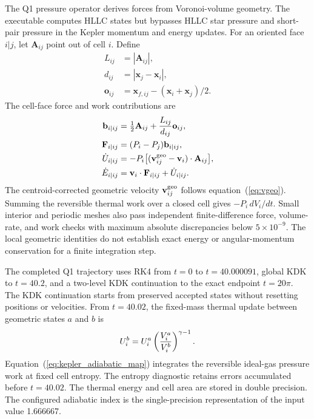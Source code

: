 \documentclass[twocolumn]{aastex63}
\begin{document}
The Q1 pressure operator derives forces from Voronoi-volume geometry.
The executable computes HLLC states but bypasses HLLC star pressure and
short-pair pressure in the Kepler momentum and energy updates. For an
oriented face $i|j$, let $\mathbf A_{ij}$ point out of cell $i$. Define
\begin{equation*}
\begin{aligned}
  L_{ij}&=|\mathbf A_{ij}|,\\
  d_{ij}&=|\mathbf x_j-\mathbf x_i|,\\
  \mathbf o_{ij}&=\mathbf x_{f,ij}-(\mathbf x_i+\mathbf x_j)/2.
\end{aligned}
\end{equation*}
The cell-face force and work contributions are
\begin{align}
  \mathbf b_{i|ij}&=\tfrac12\mathbf A_{ij}
                   +{L_{ij}\over d_{ij}}\mathbf o_{ij},\\
  \mathbf F_{i|ij}&=(P_i-P_j)\mathbf b_{i|ij},\\
  \dot U_{i|ij}&=-P_i\bigl[(\mathbf v_{ij}^{\rm geo}-\mathbf v_i)
                           \cdot\mathbf A_{ij}\bigr],\\
  \dot E_{i|ij}&=\mathbf v_i\cdot\mathbf F_{i|ij}+\dot U_{i|ij}.
  \label{eq:varpress_w0}
\end{align}
The centroid-corrected geometric velocity $\mathbf v_{ij}^{\rm geo}$ follows
equation~(\ref{eq:vgeo}). Summing the reversible thermal work over a closed
cell gives $-P_i\,dV_i/dt$. Small interior and periodic meshes also pass
independent finite-difference force, volume-rate, and work checks with
maximum absolute discrepancies below $5\times10^{-9}$. The local geometric
identities do not establish exact energy or angular-momentum conservation
for a finite integration step.

The completed Q1 trajectory uses RK4 from $t=0$ to $t=40.000091$,
global KDK to $t=40.2$, and a two-level KDK continuation to the exact
endpoint $t=20\pi$. The KDK continuation starts from preserved accepted
states without resetting positions or velocities. From $t=40.02$, the
fixed-mass thermal update between geometric states $a$ and $b$ is
\begin{equation}
  U_i^b=U_i^a\left({V_i^a\over V_i^b}\right)^{\gamma-1}.
  \label{eq:kepler_adiabatic_map}
\end{equation}
Equation~(\ref{eq:kepler_adiabatic_map}) integrates the reversible ideal-gas
pressure work at fixed cell entropy. The entropy diagnostic retains errors
accumulated before $t=40.02$. The thermal energy and cell area are stored
in double precision. The configured adiabatic index is the single-precision
representation of the input value 1.666667.
\end{document}
